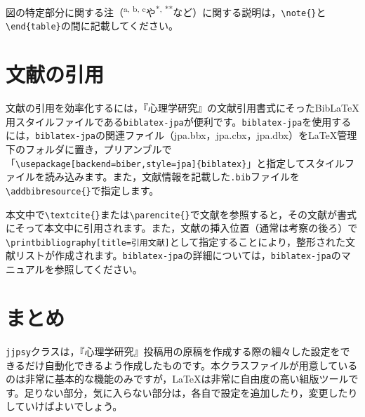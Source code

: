 \documentclass{jjpsy}
\begin{document}
図の特定部分に関する注（\textsuperscript{a, b, c}や\textsuperscript{*, **}など）に関する説明は，\texttt{\textbackslash{}note\{\}}と\texttt{\textbackslash{}end\{table\}}の間に記載してください。

\section{文献の引用}

文献の引用を効率化するには，『心理学研究』の文献引用書式にそったBib\LaTeX{}用スタイルファイルである\texttt{biblatex-jpa}が便利です。\texttt{biblatex-jpa}を使用するには，\texttt{biblatex-jpa}の関連ファイル（jpa.bbx，jpa.cbx，jpa.dbx）を\LaTeX{}管理下のフォルダに置き，プリアンブルで「\texttt{\textbackslash{}usepackage[backend=biber,style=jpa]\{biblatex\}}」と指定してスタイルファイルを読み込みます。また，文献情報を記載した\texttt{.bib}ファイルを\texttt{\textbackslash{}addbibresource\{\}}で指定します。

本文中で\texttt{\textbackslash{}textcite\{\}}または\texttt{\textbackslash{}parencite\{\}}で文献を参照すると，その文献が書式にそって本文中に引用されます。また，文献の挿入位置（通常は考察の後ろ）で\texttt{\textbackslash{}printbibliography[title=引用文献]}として指定することにより，整形された文献リストが作成されます。\texttt{biblatex-jpa}の詳細については，\texttt{biblatex-jpa}のマニュアルを参照してください。

\section{まとめ}

\texttt{jjpsy}クラスは，『心理学研究』投稿用の原稿を作成する際の細々した設定をできるだけ自動化できるよう作成したものです。本クラスファイルが用意しているのは非常に基本的な機能のみですが，\LaTeX{}は非常に自由度の高い組版ツールです。足りない部分，気に入らない部分は，各自で設定を追加したり，変更したりしていけばよいでしょう。

\noteshere %
\end{document}
